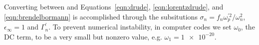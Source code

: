 Converting between  and
Equations~\ref{eqn:drude}, \ref{eqn:lorentzdrude}, and
\ref{eqn:brendelbormann} is accomplished through the subsitutions $\sigma_n
= {f_n \omega_p^{\prime 2}}/{\omega_n^2}$, $\epsilon_\infty=1$ and
$\Gamma_n^\prime$.  To prevent numerical instability, in computer codes we
set $\omega_0$, the DC term, to be a very small but nonzero value, e.g.
$\omega_1 = \num{1e-20}$. 
%
%
